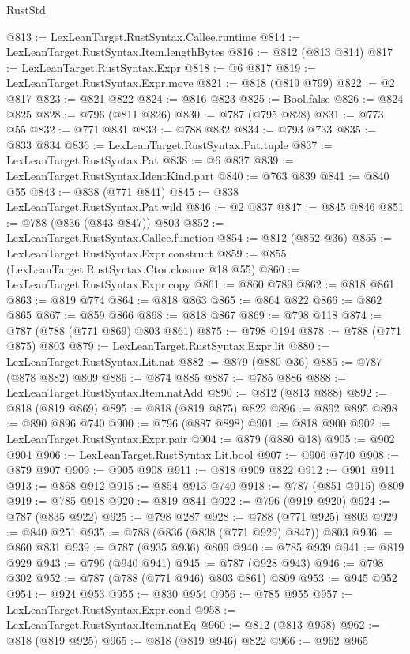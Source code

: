 \begin{lexlean}{RustStd}
\begin{coremodule}
@813 := LexLeanTarget.RustSyntax.Callee.runtime
@814 := LexLeanTarget.RustSyntax.Item.lengthBytes
@816 := @812 (@813 @814)
@817 := LexLeanTarget.RustSyntax.Expr
@818 := @6 @817
@819 := LexLeanTarget.RustSyntax.Expr.move
@821 := @818 (@819 @799)
@822 := @2 @817
@823 := @821 @822
@824 := @816 @823
@825 := Bool.false
@826 := @824 @825
@828 := @796 (@811 @826)
@830 := @787 (@795 @828)
@831 := @773 @55
@832 := @771 @831
@833 := @788 @832
@834 := @793 @733
@835 := @833 @834
@836 := LexLeanTarget.RustSyntax.Pat.tuple
@837 := LexLeanTarget.RustSyntax.Pat
@838 := @6 @837
@839 := LexLeanTarget.RustSyntax.IdentKind.part
@840 := @763 @839
@841 := @840 @55
@843 := @838 (@771 @841)
@845 := @838 LexLeanTarget.RustSyntax.Pat.wild
@846 := @2 @837
@847 := @845 @846
@851 := @788 (@836 (@843 @847)) @803
@852 := LexLeanTarget.RustSyntax.Callee.function
@854 := @812 (@852 @36)
@855 := LexLeanTarget.RustSyntax.Expr.construct
@859 := @855 (LexLeanTarget.RustSyntax.Ctor.closure @18 @55)
@860 := LexLeanTarget.RustSyntax.Expr.copy
@861 := @860 @789
@862 := @818 @861
@863 := @819 @774
@864 := @818 @863
@865 := @864 @822
@866 := @862 @865
@867 := @859 @866
@868 := @818 @867
@869 := @798 @118
@874 := @787 (@788 (@771 @869) @803 @861)
@875 := @798 @194
@878 := @788 (@771 @875) @803
@879 := LexLeanTarget.RustSyntax.Expr.lit
@880 := LexLeanTarget.RustSyntax.Lit.nat
@882 := @879 (@880 @36)
@885 := @787 (@878 @882) @809
@886 := @874 @885
@887 := @785 @886
@888 := LexLeanTarget.RustSyntax.Item.natAdd
@890 := @812 (@813 @888)
@892 := @818 (@819 @869)
@895 := @818 (@819 @875) @822
@896 := @892 @895
@898 := @890 @896 @740
@900 := @796 (@887 @898)
@901 := @818 @900
@902 := LexLeanTarget.RustSyntax.Expr.pair
@904 := @879 (@880 @18)
@905 := @902 @904
@906 := LexLeanTarget.RustSyntax.Lit.bool
@907 := @906 @740
@908 := @879 @907
@909 := @905 @908
@911 := @818 @909 @822
@912 := @901 @911
@913 := @868 @912
@915 := @854 @913 @740
@918 := @787 (@851 @915) @809
@919 := @785 @918
@920 := @819 @841
@922 := @796 (@919 @920)
@924 := @787 (@835 @922)
@925 := @798 @287
@928 := @788 (@771 @925) @803
@929 := @840 @251
@935 := @788 (@836 (@838 (@771 @929) @847)) @803
@936 := @860 @831
@939 := @787 (@935 @936) @809
@940 := @785 @939
@941 := @819 @929
@943 := @796 (@940 @941)
@945 := @787 (@928 @943)
@946 := @798 @302
@952 := @787 (@788 (@771 @946) @803 @861) @809
@953 := @945 @952
@954 := @924 @953
@955 := @830 @954
@956 := @785 @955
@957 := LexLeanTarget.RustSyntax.Expr.cond
@958 := LexLeanTarget.RustSyntax.Item.natEq
@960 := @812 (@813 @958)
@962 := @818 (@819 @925)
@965 := @818 (@819 @946) @822
@966 := @962 @965

\end{coremodule}
\end{lexlean}
